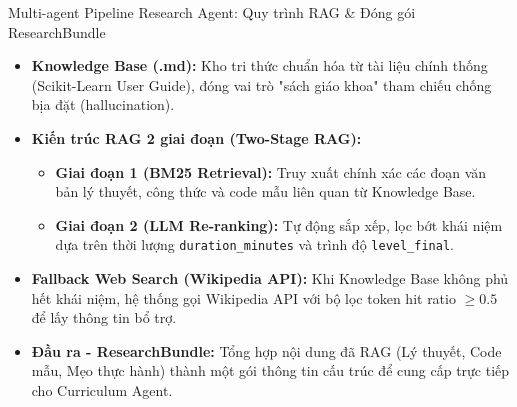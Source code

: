 \documentclass[aspectratio=169, 10pt, t]{beamer}
\begin{document}
\begin{frame}[fragile]{Multi-agent Pipeline}
  Research Agent: Quy trình RAG \& Đóng gói ResearchBundle
  \begin{itemize}
    \item \textbf{Knowledge Base (.md):} Kho tri thức chuẩn hóa từ tài liệu chính thống (Scikit-Learn User Guide), đóng vai trò "sách giáo khoa" tham chiếu chống bịa đặt (hallucination).
    \item \textbf{Kiến trúc RAG 2 giai đoạn (Two-Stage RAG):}
      \begin{itemize}
        \item \textbf{Giai đoạn 1 (BM25 Retrieval):} Truy xuất chính xác các đoạn văn bản lý thuyết, công thức và code mẫu liên quan từ Knowledge Base.
        \item \textbf{Giai đoạn 2 (LLM Re-ranking):} Tự động sắp xếp, lọc bớt khái niệm dựa trên thời lượng \texttt{duration\_minutes} và trình độ \texttt{level\_final}.
      \end{itemize}
    \item \textbf{Fallback Web Search (Wikipedia API):} Khi Knowledge Base không phủ hết khái niệm, hệ thống gọi Wikipedia API với bộ lọc token hit ratio $\ge 0.5$ để lấy thông tin bổ trợ.
    \item \textbf{Đầu ra - ResearchBundle:} Tổng hợp nội dung đã RAG (Lý thuyết, Code mẫu, Mẹo thực hành) thành một gói thông tin cấu trúc để cung cấp trực tiếp cho Curriculum Agent.
  \end{itemize}
\end{frame}
\end{document}

